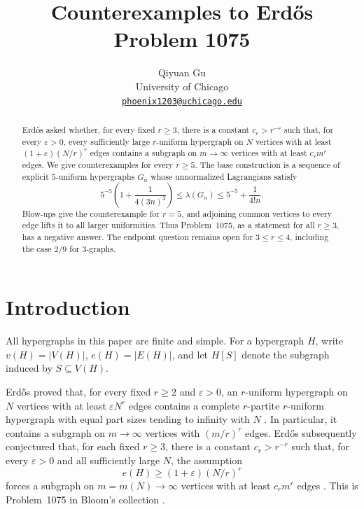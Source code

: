 \documentclass[11pt]{article}
\title{Counterexamples to Erd\H{o}s Problem 1075}
\author{Qiyuan Gu\\
University of Chicago\\
\href{mailto:phoenix1203@uchicago.edu}{\texttt{phoenix1203@uchicago.edu}}}
\date{}
\numberwithin{equation}{section}
\begin{document}
\maketitle

\begin{abstract}
Erd\H{o}s asked whether, for every fixed \(r\ge3\), there is a constant
\(c_r>r^{-r}\) such that, for every \(\varepsilon>0\), every
sufficiently large \(r\)-uniform hypergraph on \(N\) vertices with
at least \((1+\varepsilon)(N/r)^r\) edges contains
a subgraph on \(m\to\infty\) vertices with at least \(c_rm^r\) edges.
We give counterexamples for every \(r\ge5\). The base construction is
a sequence of explicit \(5\)-uniform hypergraphs \(G_n\) whose
unnormalized Lagrangians satisfy
\[
 5^{-5}\left(1+\frac1{4(3n)^{3}}\right)
 \le\lambda(G_n)\le5^{-5}+\frac1{4!n}.
\]
Blow-ups give the counterexample for \(r=5\), and adjoining common
vertices to every edge lifts it to all larger uniformities. Thus
Problem~1075, as a statement for all \(r\ge3\), has a negative answer.
The endpoint question remains open for \(3\le r\le4\), including the
case \(2/9\) for \(3\)-graphs.
\end{abstract}

\section{Introduction}

All hypergraphs in this paper are finite and simple. For a hypergraph
\(H\), write \(v(H)=|V(H)|\), \(e(H)=|E(H)|\), and let \(H[S]\)
denote the subgraph induced by \(S\subseteq V(H)\).

Erd\H{o}s proved that, for every fixed \(r\ge2\) and \(\varepsilon>0\),
an \(r\)-uniform hypergraph on \(N\) vertices with at least
\(\varepsilon N^r\) edges contains a complete \(r\)-partite
\(r\)-uniform hypergraph with equal part sizes tending to infinity
with \(N\) \cite{Erdos64}. In particular, it contains a subgraph
on \(m\to\infty\) vertices with \((m/r)^r\) edges.
Erd\H{o}s subsequently conjectured that, for each fixed \(r\ge3\),
there is a constant \(c_r>r^{-r}\) such that, for every
\(\varepsilon>0\) and all sufficiently large \(N\), the assumption
\[
 e(H)\ge(1+\varepsilon)(N/r)^r
\]
forces a subgraph on \(m=m(N)\to\infty\) vertices with at least
\(c_rm^r\) edges \cite[p.~80]{Erdos74}.
This is Problem~1075 in Bloom's collection \cite{Bloom}.
\end{document}

